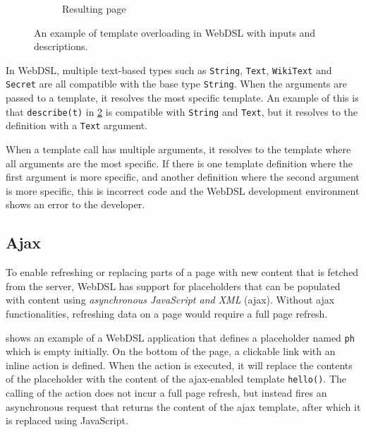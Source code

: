 \begin{figure}
\begin{subfigure}[t]{0.55\textwidth}
          \caption{\label{fig:webdsl-template-overloading-page}Resulting page}
        \end{subfigure}
      \caption{\label{fig:webdsl-template-overloading}An example of template overloading in WebDSL with inputs and descriptions.}
      \end{figure}

      In WebDSL, multiple text-based types such as \texttt{String}, \texttt{Text}, \texttt{WikiText} and \texttt{Secret} are all compatible with the base type \texttt{String}. When the arguments are passed to a template, it resolves the most specific template. An example of this is that \texttt{describe(t)} in \cref{fig:webdsl-template-overloading} is compatible with \texttt{String} and \texttt{Text}, but it resolves to the definition with a \texttt{Text} argument.

      When a template call has multiple arguments, it resolves to the template where all arguments are the most specific. If there is one template definition where the first argument is more specific, and another definition where the second argument is more specific, this is incorrect code and the WebDSL development environment shows an error to the developer.

    \subsection{\label{subsec:ajax}Ajax}

      To enable refreshing or replacing parts of a page with new content that is fetched from the server, WebDSL has support for placeholders that can be populated with content using \textit{asynchronous JavaScript and XML} (ajax). Without ajax functionalities, refreshing data on a page would require a full page refresh.

       shows an example of a WebDSL application that defines a placeholder named \texttt{ph} which is empty initially. On the bottom of the page, a clickable link with an inline action is defined. When the action is executed, it will replace the contents of the placeholder with the content of the ajax-enabled template \texttt{hello()}. The calling of the action does not incur a full page refresh, but instead fires an asynchronous request that returns the content of the ajax template, after which it is replaced using JavaScript.

